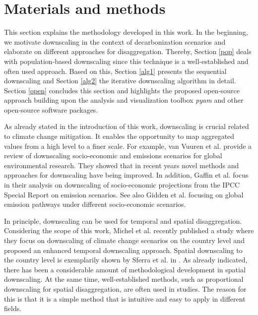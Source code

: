 \section{Materials and methods}\label{methodology}
This section explains the methodology developed in this work. In the beginning, we motivate downscaling in the context of decarbonization scenarios and elaborate on different approaches for disaggregation. Thereby, Section \ref{pop} deals with population-based downscaling since this technique is a well-established and often used approach. Based on this, Section \ref{alg1} presents the sequential downscaling and Section \ref{alg2} the iterative downscaling algorithm in detail. Section \ref{open} concludes this section and highlights the proposed open-source approach building upon the analysis and visualization toolbox \textit{pyam} and other open-source software packages.\newline

As already stated in the introduction of this work, downscaling is crucial related to climate change mitigation. It enables the opportunity to map aggregated values from a high level to a finer scale. For example, van Vuuren et al. \cite{van2010downscaling} provide a review of downscaling socio-economic and emissions scenarios for global environmental research. They showed that in recent years novel methods and approaches for downscaling have being improved. In addition, Gaffin et al. \cite{gaffin2004downscaling} focus in their analysis on downscaling of socio-economic projections from the IPCC Special Report on emission scenarios. See also Gidden et al. \cite{gidden2019global} focusing on global emission pathways under different socio-economic scenarios.\newline 

In principle, downscaling can be used for temporal and spatial disaggregation. Considering the scope of this work, Michel et al. \cite{michel2021climate} recently published a study where they focus on downscaling of climate change scenarios on the country level and proposed an enhanced temporal downscaling approach. Spatial downscaling to the country level is exemplarily shown by Sferra et al. in \cite{sferra2019towards}. As already indicated, there has been a considerable amount of methodological development in spatial downscaling. At the same time, well-established methods, such as proportional downscaling for spatial disaggregation, are often used in studies. The reason for this is that it is a simple method that is intuitive and easy to apply in different fields. 

